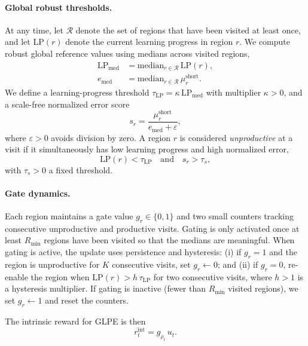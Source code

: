 \paragraph{Global robust thresholds.}
At any time, let $\mathcal{R}$ denote the set of regions that have been visited at least once, and let $\mathrm{LP}(r)$ denote the current learning progress in region $r$.
We compute robust global reference values using medians across visited regions,
\begin{equation}
\begin{aligned}
    \mathrm{LP}_{\mathrm{med}} &= \mathrm{median}_{r\in\mathcal{R}}\,\mathrm{LP}(r),\\
    e_{\mathrm{med}} &= \mathrm{median}_{r\in\mathcal{R}}\,\mu^{\mathrm{short}}_r.
\end{aligned}
\end{equation}
We define a learning-progress threshold $\tau_{\mathrm{LP}} = \kappa\,\mathrm{LP}_{\mathrm{med}}$ with multiplier $\kappa>0$, and a scale-free normalized error score
\begin{equation}
    s_r = \frac{\mu^{\mathrm{short}}_r}{e_{\mathrm{med}} + \varepsilon},
\end{equation}
where $\varepsilon>0$ avoids division by zero.
A region $r$ is considered \emph{unproductive} at a visit if it simultaneously has low learning progress and high normalized error,
\begin{equation}
    \mathrm{LP}(r) < \tau_{\mathrm{LP}} \quad\text{and}\quad s_r > \tau_s,
\end{equation}
with $\tau_s>0$ a fixed threshold.

\paragraph{Gate dynamics.}
Each region maintains a gate value $g_r\in\{0,1\}$ and two small counters tracking consecutive unproductive and productive visits.
Gating is only activated once at least $R_{\min}$ regions have been visited so that the medians are meaningful.
When gating is active, the update uses persistence and hysteresis: (i) if $g_r=1$ and the region is unproductive for $K$ consecutive visits, set $g_r\leftarrow 0$; and (ii) if $g_r=0$, re-enable the region when $\mathrm{LP}(r) > h\,\tau_{\mathrm{LP}}$ for two consecutive visits, where $h>1$ is a hysteresis multiplier.
If gating is inactive (fewer than $R_{\min}$ visited regions), we set $g_r\leftarrow 1$ and reset the counters.

The intrinsic reward for GLPE is then
\begin{equation}
    r_t^{\mathrm{int}} = g_{\rho_t}\,u_t.
\end{equation}

